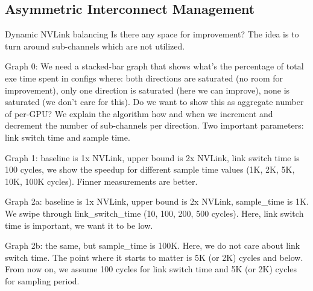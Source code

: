 \subsection{Asymmetric Interconnect Management}
\label{interconnect}

Dynamic NVLink balancing Is there any space for improvement? The idea is to turn 
around sub-channels which are not utilized. 

Graph 0: We need a stacked-bar graph that shows what’s the percentage of total 
exe time spent in configs where: both directions are saturated (no room for 
improvement), only one direction is saturated (here we can improve), none is 
saturated (we don’t care for this). Do we want to show this as aggregate number 
of per-GPU?
We explain the algorithm how and when we increment and decrement the number of 
sub-channels per direction. Two important parameters: link switch time and 
sample time.

Graph 1: baseline is 1x NVLink, upper bound is 2x NVLink, link switch time is 
100 cycles, we show the speedup for different sample time values (1K, 2K, 5K, 
10K, 100K cycles). Finner measurements are better.

Graph 2a: baseline is 1x NVLink, upper bound is 2x NVLink, sample\_time is 1K. 
We swipe through link\_switch\_time (10, 100, 200, 500 cycles). Here, link 
switch time is important, we want it to be low.

Graph 2b: the same, but sample\_time is 100K. Here, we do not care about link 
switch time. The point where it starts to matter is 5K (or 2K) cycles and below. 
From now on, we assume 100 cycles for link switch time and 5K (or 2K) cycles for 
sampling period.

